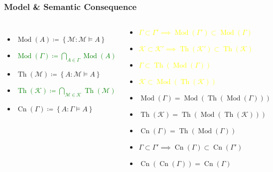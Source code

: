 \documentclass[UTF8,aspectratio=43,11pt,colorlinks,compress,openany]{beamer}%
\begin{document}
\begin{frame}\frametitle{Model \& Semantic Consequence}
\begin{columns}
	\begin{itemize}
		\item $\operatorname{Mod}(A)\coloneqq \left\{\mathcal{M}: \mathcal{M}\vDash A\right\}$
		\item \textcolor{green}{$\operatorname{Mod}(\Gamma)\coloneqq \bigcap\limits_{A\in\Gamma}\operatorname{Mod}(A)$}
		\item $\operatorname{Th}(\mathcal{M})\coloneqq \left\{A: \mathcal{M}\vDash A\right\}$
		\item \textcolor{green}{$\operatorname{Th}(\mathcal{K})\coloneqq \bigcap\limits_{\mathcal{M}\in\mathcal{K}}\operatorname{Th}(\mathcal{M})$}
		\item $\operatorname{Cn}(\Gamma)\coloneqq \left\{A: \Gamma\vDash A\right\}$
	\end{itemize}
	\begin{block}{}
		\begin{itemize}
			\item \textcolor{yellow}{$\Gamma\subset\Gamma'\implies\operatorname{Mod}(\Gamma')\subset\operatorname{Mod}(\Gamma)$}
			\item \textcolor{yellow}{$\mathcal{K}\subset\mathcal{K}'\implies\operatorname{Th}(\mathcal{K}')\subset\operatorname{Th}(\mathcal{K})$}
			\item \textcolor{yellow}{$\Gamma\subset\operatorname{Th}(\operatorname{Mod}(\Gamma))$}
			\item \textcolor{yellow}{$\mathcal{K}\subset\operatorname{Mod}(\operatorname{Th}(\mathcal{K}))$}
			\item $\operatorname{Mod}(\Gamma)=\operatorname{Mod}(\operatorname{Th}(\operatorname{Mod}(\Gamma)))$
			\item $\operatorname{Th}(\mathcal{K})=\operatorname{Th}(\operatorname{Mod}(\operatorname{Th}(\mathcal{K})))$
			\item $\operatorname{Cn}(\Gamma)=\operatorname{Th}(\operatorname{Mod}(\Gamma))$
			\item $\Gamma\subset\Gamma'\implies \operatorname{Cn}(\Gamma)\subset \operatorname{Cn}(\Gamma')$
			\item $\operatorname{Cn}(\operatorname{Cn}(\Gamma))=\operatorname{Cn}(\Gamma)$
		\end{itemize}
	\end{block}
\end{columns}
\end{frame}
\end{document}
